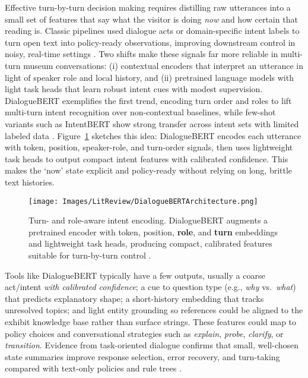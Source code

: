 \documentclass[12pt]{article}
\begin{document}
Effective turn-by-turn decision making requires distilling raw utterances into a small set of features that say what the visitor is doing \emph{now} and how certain that reading is. Classic pipelines used dialogue acts or domain-specific intent labels to turn open text into policy-ready observations, improving downstream control in noisy, real-time settings \citep{williams2007pomdp,young2013pomdp}. Two shifts make these signals far more reliable in multi-turn museum conversations: (i) contextual encoders that interpret an utterance in light of speaker role and local history, and (ii) pretrained language models with light task heads that learn robust intent cues with modest supervision. DialogueBERT exemplifies the first trend, encoding turn order and roles to lift multi-turn intent recognition over non-contextual baselines, while few-shot variants such as IntentBERT show strong transfer across intent sets with limited labeled data \citep{zhang2021dialoguebert,zhang2021intentbert}. Figure~\ref{fig:dialoguebert-compact-intent} sketches this idea: DialogueBERT encodes each utterance with token, position, speaker-role, and turn-order signals, then uses lightweight task heads to output compact intent features with calibrated confidence. This makes the ‘now’ state explicit and policy-ready without relying on long, brittle text histories.\\

\begin{figure}[h]
  \centering
  \texttt{[image: Images/LitReview/DialogueBERTArchitecture.png]}
  \caption{Turn- and role-aware intent encoding. DialogueBERT augments a pretrained encoder with token, position, \textbf{role}, and \textbf{turn} embeddings and lightweight task heads, producing compact, calibrated features suitable for turn-by-turn control \citep{zhang2021dialoguebert}.}
  \label{fig:dialoguebert-compact-intent}
\end{figure}


Tools like DialogueBERT typically have a few outputs, usually a coarse act/intent \emph{with calibrated confidence}; a cue to question type (e.g., \emph{why} vs.\ \emph{what}) that predicts explanatory shape; a short-history embedding that tracks unresolved topics; and light entity grounding so references could be aligned to the exhibit knowledge base rather than surface strings. These features could map to policy choices and conversational strategies such as \emph{explain}, \emph{probe}, \emph{clarify}, or \emph{transition}. Evidence from task-oriented dialogue confirms that small, well-chosen state summaries improve response selection, error recovery, and turn-taking compared with text-only policies and rule trees \citep{kwan2023dplsurvey,casanueva2018feudal,wang2021hdno}.\\
\end{document}
